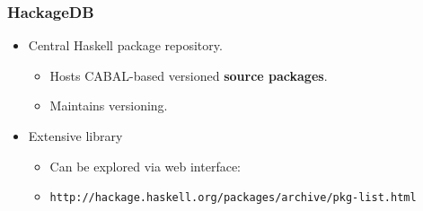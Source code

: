 \begin{frame}
  \frametitle{HackageDB}
  \begin{itemize}
    \item Central Haskell package repository.
      \begin{itemize} 
        \item Hosts CABAL-based versioned {\bf source packages}.
        \item Maintains versioning.
      \end{itemize}
    \item Extensive library
      \begin{itemize}
        \item Can be explored via web interface: 
        \item \texttt{http://hackage.haskell.org/packages/archive/pkg-list.html}
      \end{itemize}
  \end{itemize}
\end{frame}